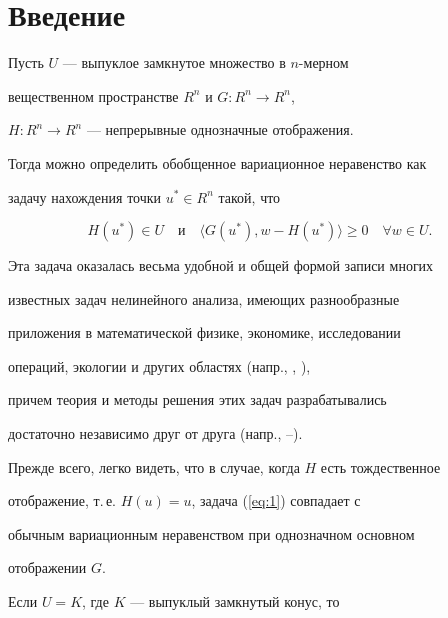 \label{begin}








\section{Введение}





Пусть $U$ --- выпуклое замкнутое множество в $n$-мерном 


вещественном пространстве $R^{n}$ и $G : R^{n} \rightarrow R^{n}$, 


$H : R^{n} \rightarrow R^{n}$ --- непрерывные однозначные отображения.


Тогда можно определить обобщенное вариационное неравенство как 


задачу нахождения точки $u^{*}\in R^{n}$ такой, что


\begin{equation} \label{eq:1}


H(u^{*}) \in U \quad \text{и} \quad


\langle G(u^{*}), w-H(u^{*}) \rangle \geq 0 \quad \forall w \in U.


\end{equation}


Эта задача оказалась весьма удобной и общей формой записи многих 


известных задач нелинейного анализа, имеющих разнообразные 


приложения в математической физике, экономике, исследовании 


операций, экологии и других областях (напр., \cite{NNR93}, \cite{Noo94}), 


причем теория и методы решения этих задач разрабатывались 


достаточно независимо друг от друга (напр., \cite{HP90}--\cite{BL87}).


Прежде всего, легко видеть, что в случае, когда $H$ есть тождественное 


отображение, т.\,е. $H(u)=u$, задача (\ref{eq:1}) совпадает с 


обычным вариационным неравенством при однозначном основном 


отображении $G$.





Если $U=K$, где $K$ --- выпуклый замкнутый конус, то 


